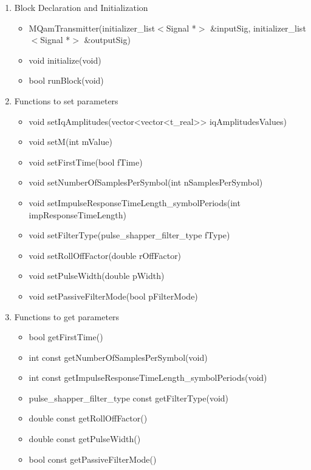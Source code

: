     \begin{enumerate}
         \item Block Declaration and Initialization
             \begin{itemize}
                 \item MQamTransmitter(initializer\_list$<$Signal *$>$ \&inputSig, initializer\_list$<$Signal *$>$ \&outputSig)
                 \item void initialize(void)
	             \item bool runBlock(void)
             \end{itemize}
         \item Functions to set parameters
             \begin{itemize}
                \item void setIqAmplitudes(vector<vector<t\_real>> iqAmplitudesValues)
                \item void setM(int mValue)
                \item void setFirstTime(bool fTime)
                \item void setNumberOfSamplesPerSymbol(int nSamplesPerSymbol)
                \item void setImpulseResponseTimeLength\_symbolPeriods\newline(int impResponseTimeLength)
                \item void setFilterType(pulse\_shapper\_filter\_type fType)
                \item void setRollOffFactor(double rOffFactor)
                \item void setPulseWidth(double pWidth)
                \item void setPassiveFilterMode(bool pFilterMode)
             \end{itemize}
         \item Functions to get parameters
             \begin{itemize}
                \item bool getFirstTime()
                \item int const getNumberOfSamplesPerSymbol(void)
                \item int const getImpulseResponseTimeLength\_symbolPeriods(void)
                \item pulse\_shapper\_filter\_type const getFilterType(void)
                \item double const getRollOffFactor()
                \item double const getPulseWidth()
                \item bool const getPassiveFilterMode()
             \end{itemize}
     \end{enumerate}
